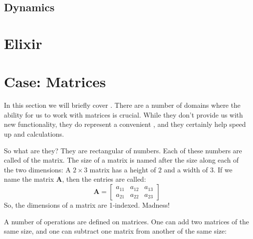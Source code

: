 
\subsection{Dynamics}




\section{Elixir}




\section{Case: Matrices}

In this section we will briefly cover . There are a number of domains where the ability for us to work with matrices is crucial. While they don't provide us with new functionality, they do represent a convenient , and they certainly help speed up  and  calculations.

So what are they? They are rectangular  of numbers. Each of these numbers are called  of the matrix. The size of a matrix is named after the size along each of the two dimensions: A $2 \times 3$ matrix has a height of $2$ and a width of $3$. If we name the matrix $\mathbf{A}$, then the entries are called:
\begin{equation*}
  \mathbf{A} =
  \left[
    \begin{matrix}
      a_{11} & a_{12} & a_{13} \\
      a_{21} & a_{22} & a_{23}
    \end{matrix}
  \right]
\end{equation*}
So, the dimensions of a matrix are 1-indexed. Madness!

A number of operations are defined on matrices. One can add two matrices of the same size, and one can subtract one matrix from another of the same size:

